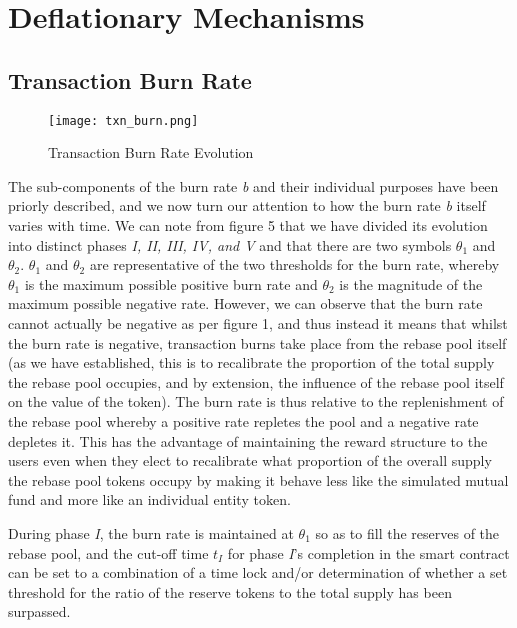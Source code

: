 \documentclass[12pt]{article}
\begin{document}
\section{Deflationary Mechanisms}
    
    \subsection{Transaction Burn Rate}
    
    \begin{figure}[!htb]
        \centering
        \texttt{[image: txn\_burn.png]}
        \caption{Transaction Burn Rate Evolution}
        \label{fig:my_label}
    \end{figure}
    
    The sub-components of the burn rate \emph{b} and their individual purposes have been priorly described, and we now turn our attention to how the burn rate \emph{b} itself varies with time. We can note from figure 5 that we have divided its evolution into distinct phases \emph{I, II, III, IV, and V} and that there are two symbols \(\theta_1\) and \(\theta_2\). \(\theta_1\) and \(\theta_2\) are representative of the two thresholds for the burn rate, whereby \(\theta_1\) is the maximum possible positive burn rate and \(\theta_2\) is the magnitude of the maximum possible negative rate. However, we can observe that the burn rate cannot actually be negative as per figure 1, and thus instead it means that whilst the burn rate is negative, transaction burns take place from the rebase pool itself (as we have established, this is to recalibrate the proportion of the total supply the rebase pool occupies, and by extension, the influence of the rebase pool itself on the value of the token). The burn rate is thus relative to the replenishment of the rebase pool whereby a positive rate repletes the pool and a negative rate depletes it. This has the advantage of maintaining the reward structure to the users even when they elect to recalibrate what proportion of the overall supply the rebase pool tokens occupy by making it behave less like the simulated mutual fund and more like an individual entity token. \par 
    \vspace{0.15cm}
    
    During phase \emph{I}, the burn rate is maintained at \(\theta_1\) so as to fill the reserves of the rebase pool, and the cut-off time \emph{$t_I$} for phase \emph{I}'s completion in the smart contract can be set to a combination of a time lock and/or determination of whether a set threshold for the ratio of the reserve tokens to the total supply has been surpassed. \par
    
\end{document}
